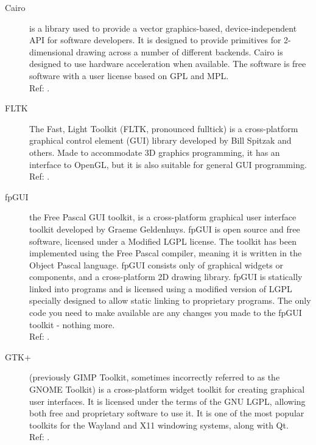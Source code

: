 \begin{description}
    \item[Cairo] is a library used to provide a vector graphics-based,
		device-independent API for software developers. It is designed
		to provide primitives for 2-dimensional drawing across a number
		of different backends. Cairo is designed to use hardware
		acceleration when available.
		The software is free software with a user license based on GPL
		and MPL.
		\hspace*{\fill}\\Ref: \cite{wiki:cairo}.

    \item[FLTK] The Fast, Light Toolkit (FLTK, pronounced fulltick) is a
		cross-platform graphical control element (GUI)
		library developed by Bill Spitzak and others. Made to
		accommodate 3D graphics programming, it has an interface to
		OpenGL, but it is also suitable for general GUI programming.
		\hspace*{\fill}\\Ref: \cite{wiki:fltk}.

    \item[fpGUI] the Free Pascal GUI toolkit, is a cross-platform
		graphical user interface toolkit developed by Graeme Geldenhuys.
		fpGUI is open source and free software, licensed under a Modified LGPL
		license. The toolkit has been implemented using the Free Pascal
		compiler, meaning it is written in the Object Pascal language.
		fpGUI consists only of graphical widgets or components, and a
		cross-platform 2D drawing library.
		fpGUI is statically linked into programs and is licensed using a
		modified version of LGPL specially designed to allow static linking to
		proprietary programs. The only code you need to make available are
		any changes you made to the fpGUI toolkit - nothing more.
		\hspace*{\fill}\\Ref: \cite{wiki:fpgui}.

    \item[GTK+] (previously GIMP Toolkit, sometimes incorrectly referred to
		as the GNOME Toolkit) is a cross-platform widget toolkit for
		creating graphical user interfaces. It is licensed under the terms
		of the GNU LGPL, allowing both free and proprietary software to use
		it. It is one of the most popular toolkits for the Wayland and
		X11 windowing systems, along with Qt.
		\hspace*{\fill}\\Ref: \cite{wiki:gtk+}.


\end{description}
